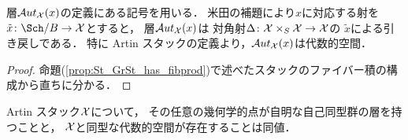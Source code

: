     \begin{Lemma}
        層$\mathcal{A}ut_{\mathcal{X}}(x)$の定義にある記号を用いる．
        米田の補題により$x$に対応する射を$\tilde{x} \colon \Sch/B \to \stX$とすると，
        層$\mathcal{A}ut_{\mathcal{X}}(x)$は
        対角射$\Delta \colon \mathcal{X} \times_{S} \mathcal{X} \to \mathcal{X}$の
        $\tilde{x}$による引き戻しである．
        特に Artin スタックの定義より，$\mathcal{A}ut_{\mathcal{X}}(x)$は代数的空間．
    \end{Lemma}
    \begin{proof}
        命題(\ref{prop:St_GrSt_has_fibprod})で述べたスタックのファイバー積の構成から直ちに分かる．
    \end{proof}

    \begin{Prop}
         Artin スタック$\mathcal{X}$について，
        その任意の幾何学的点が自明な自己同型群の層を持つことと，
        $\mathcal{X}$と同型な代数的空間が存在することは同値．
    \end{Prop}

    \printbibliography[title=参考文献]

